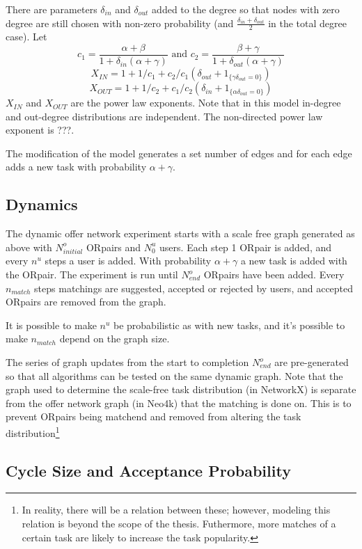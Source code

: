 \documentclass[main.tex]{subfiles}
\begin{document}
There are parameters $\delta_{in}$ and $\delta_{out}$ added to the degree so that nodes with zero degree are still chosen with non-zero probability (and $\frac{\delta_{in} + \delta_{out}}{2}$ in the total degree case). Let
$$c_1 = \frac{\alpha + \beta}{1 + \delta_{in}(\alpha + \gamma)} \mbox{ and } c_2 = \frac{\beta + \gamma}{1 + \delta_{out}(\alpha + \gamma)}$$
$$X_{IN} = 1 + 1/c_1 + c_2/c_1(\delta_{out} + 1_{\{\gamma \delta_{out}=0\}})$$
$$X_{OUT} = 1 + 1/c_2 + c_1/c_2(\delta_{in} + 1_{\{\alpha \delta_{out}=0\}})$$
$X_{IN}$ and $X_{OUT}$ are the power law exponents. Note that in this model in-degree and out-degree distributions are independent. The non-directed power law exponent is ???.

The modification of the model generates a set number of edges and for each edge adds a new task with probability $\alpha + \gamma$.

\subsection{Dynamics}
The dynamic offer network experiment starts with a scale free graph generated as above with $N^o_{initial}$ ORpairs and $N^u_0$ users. Each step 1 ORpair is added, and every $n^u$ steps a user is added. With probability $\alpha + \gamma$ a new task is added with the ORpair. The experiment is run until $N^o_{end}$ ORpairs have been added. Every $n_{match}$ steps matchings are suggested, accepted or rejected by users, and accepted ORpairs are removed from the graph.

It is possible to make $n^u$ be probabilistic as with new tasks, and it's possible to make $n_{match}$ depend on the graph size.

The series of graph updates from the start to completion $N_{end}^o$ are pre-generated so that all algorithms can be tested on the same dynamic graph. Note that the graph used to determine the scale-free task distribution (in NetworkX) is separate from the offer network graph (in Neo4k) that the matching is done on. This is to prevent ORpairs being matchend and removed from altering the task distribution\footnote{In reality, there will be a relation between these; however, modeling this relation is beyond the scope of the thesis. Futhermore, more matches of a certain task are likely to increase the task popularity.}

\subsection{Cycle Size and Acceptance Probability}
\end{document}
